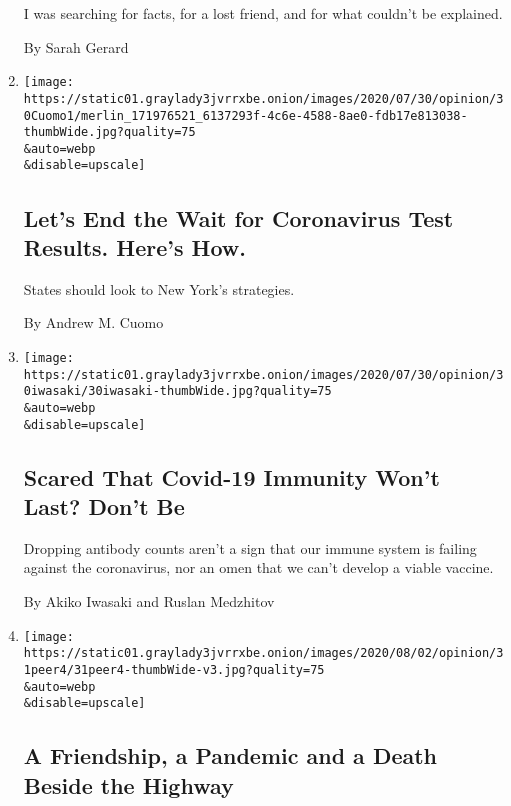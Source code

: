 \begin{enumerate}
  I was searching for facts, for a lost friend, and for what couldn't be
  explained.

  By Sarah Gerard
\item
  \href{/2020/07/31/opinion/coronavirus-testing-cuomo.html}{}

  \texttt{[image: https://static01.graylady3jvrrxbe.onion/images/2020/07/30/opinion/30Cuomo1/merlin\_171976521\_6137293f-4c6e-4588-8ae0-fdb17e813038-thumbWide.jpg?quality=75\\\&auto=webp\\\&disable=upscale]}

  \hypertarget{lets-end-the-wait-for-coronavirus-test-results-heres-how}{%
  \subsection{Let's End the Wait for Coronavirus Test Results. Here's
  How.}\label{lets-end-the-wait-for-coronavirus-test-results-heres-how}}

  States should look to New York's strategies.

  By Andrew M. Cuomo
\item
  \href{/2020/07/31/opinion/coronavirus-antibodies-immunity.html}{}

  \texttt{[image: https://static01.graylady3jvrrxbe.onion/images/2020/07/30/opinion/30iwasaki/30iwasaki-thumbWide.jpg?quality=75\\\&auto=webp\\\&disable=upscale]}

  \hypertarget{scared-that-covid-19-immunity-wont-last-dont-be}{%
  \subsection{Scared That Covid-19 Immunity Won't Last? Don't
  Be}\label{scared-that-covid-19-immunity-wont-last-dont-be}}

  Dropping antibody counts aren't a sign that our immune system is
  failing against the coronavirus, nor an omen that we can't develop a
  viable vaccine.

  By Akiko Iwasaki and Ruslan Medzhitov
\item
  \href{/2020/07/31/opinion/sunday/India-migration-coronavirus.html}{}

  \texttt{[image: https://static01.graylady3jvrrxbe.onion/images/2020/08/02/opinion/31peer4/31peer4-thumbWide-v3.jpg?quality=75\\\&auto=webp\\\&disable=upscale]}

  \hypertarget{a-friendship-a-pandemic-and-a-death-beside-the-highway}{%
  \subsection{A Friendship, a Pandemic and a Death Beside the
  Highway}\label{a-friendship-a-pandemic-and-a-death-beside-the-highway}}


\end{enumerate}
